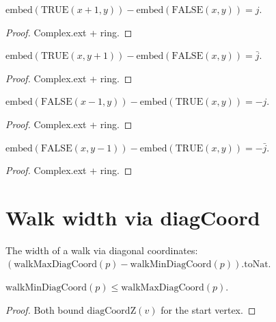 \begin{lemma}
\begin{lemma}\label{lem:dir_false_plus1}
\leanok
{}
  $\mathrm{embed}(\mathrm{TRUE}(x{+}1,y)) - \mathrm{embed}(\mathrm{FALSE}(x,y)) = j$.
\end{lemma}
\begin{proof}\leanok Complex.ext + ring.\end{proof}

\begin{lemma}\label{lem:dir_false_yplus1}
\leanok
{}
  $\mathrm{embed}(\mathrm{TRUE}(x,y{+}1)) - \mathrm{embed}(\mathrm{FALSE}(x,y)) = \bar{j}$.
\end{lemma}
\begin{proof}\leanok Complex.ext + ring.\end{proof}

\begin{lemma}\label{lem:dir_true_minus1}
\leanok
  $\mathrm{embed}(\mathrm{FALSE}(x{-}1,y)) - \mathrm{embed}(\mathrm{TRUE}(x,y)) = -j$.
\end{lemma}
\begin{proof}\leanok Complex.ext + ring.\end{proof}

\begin{lemma}\label{lem:dir_true_yminus1}
\leanok
  $\mathrm{embed}(\mathrm{FALSE}(x,y{-}1)) - \mathrm{embed}(\mathrm{TRUE}(x,y)) = -\bar{j}$.
\end{lemma}
\begin{proof}\leanok Complex.ext + ring.\end{proof}

\section{Walk width via diagCoord}\label{sec:walk_width_diag}

\begin{definition}\label{def:walk_width_diag}
\leanok
{}
  The width of a walk via diagonal coordinates:
  $(\mathrm{walkMaxDiagCoord}(p) - \mathrm{walkMinDiagCoord}(p)).\mathrm{toNat}$.
\end{definition}

\begin{lemma}\label{lem:max_ge_min}
\leanok
{}
  $\mathrm{walkMinDiagCoord}(p) \leq \mathrm{walkMaxDiagCoord}(p)$.
\end{lemma}
\begin{proof}\leanok Both bound $\mathrm{diagCoordZ}(v)$ for the start vertex.\end{proof}


\end{lemma}
